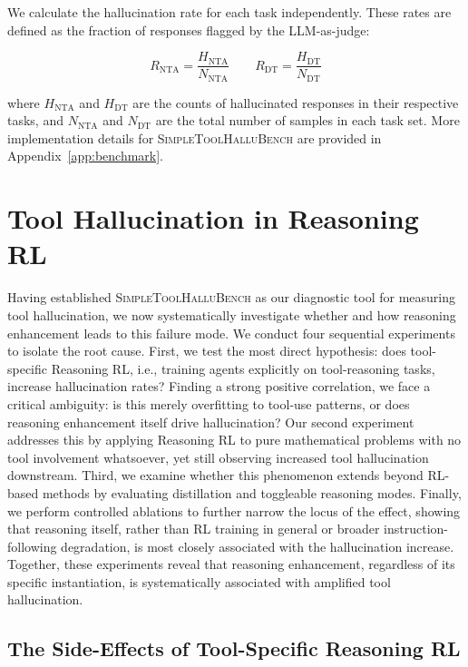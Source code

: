\documentclass[11pt]{article}
\begin{document}
We calculate the hallucination rate for each task independently. These rates are defined as the fraction of responses flagged by the LLM-as-judge:

\begin{equation}
R_{\text{NTA}} = \frac{H_{\text{NTA}}}{N_{\text{NTA}}} \qquad
R_{\text{DT}} = \frac{H_{\text{DT}}}{N_{\text{DT}}}
\end{equation}

where $H_{\text{NTA}}$ and $H_{\text{DT}}$ are the counts of hallucinated responses in their respective tasks, and $N_{\text{NTA}}$ and $N_{\text{DT}}$ are the total number of samples in each task set. More implementation details for \textsc{SimpleToolHalluBench} are provided in Appendix~\ref{app:benchmark}.

\section{Tool Hallucination in Reasoning RL}
\label{exp}

Having established \textsc{SimpleToolHalluBench} as our diagnostic tool for measuring tool hallucination, we now systematically investigate whether and how reasoning enhancement leads to this failure mode. We conduct four sequential experiments to isolate the root cause. First, we test the most direct hypothesis: does tool-specific Reasoning RL, i.e., training agents explicitly on tool-reasoning tasks, increase hallucination rates? Finding a strong positive correlation, we face a critical ambiguity: is this merely overfitting to tool-use patterns, or does reasoning enhancement itself drive hallucination? Our second experiment addresses this by applying Reasoning RL to pure mathematical problems with no tool involvement whatsoever, yet still observing increased tool hallucination downstream. Third, we examine whether this phenomenon extends beyond RL-based methods by evaluating distillation and toggleable reasoning modes. Finally, we perform controlled ablations to further narrow the locus of the effect, showing that reasoning itself, rather than RL training in general or broader instruction-following degradation, is most closely associated with the hallucination increase. Together, these experiments reveal that reasoning enhancement, regardless of its specific instantiation, is systematically associated with amplified tool hallucination.

\subsection{The Side-Effects of Tool-Specific Reasoning RL}
\label{sec:exp-recall}
\end{document}
